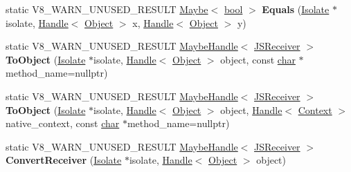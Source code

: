 \begin{DoxyCompactItemize}
\item 
\mbox{\label{classv8_1_1internal_1_1Object_a6515f78d952a5943568c01f6ff6d2113}} 
static V8\+\_\+\+W\+A\+R\+N\+\_\+\+U\+N\+U\+S\+E\+D\+\_\+\+R\+E\+S\+U\+LT \mbox{\hyperlink{classv8_1_1Maybe}{Maybe}}$<$ \mbox{\hyperlink{classbool}{bool}} $>$ {\bfseries Equals} (\mbox{\hyperlink{classv8_1_1internal_1_1Isolate}{Isolate}} $\ast$isolate, \mbox{\hyperlink{classv8_1_1internal_1_1Handle}{Handle}}$<$ \mbox{\hyperlink{classv8_1_1internal_1_1Object}{Object}} $>$ x, \mbox{\hyperlink{classv8_1_1internal_1_1Handle}{Handle}}$<$ \mbox{\hyperlink{classv8_1_1internal_1_1Object}{Object}} $>$ y)
\item 
\mbox{\label{classv8_1_1internal_1_1Object_a75d964b0770f21fb7dd288eea3369241}} 
static V8\+\_\+\+W\+A\+R\+N\+\_\+\+U\+N\+U\+S\+E\+D\+\_\+\+R\+E\+S\+U\+LT \mbox{\hyperlink{classv8_1_1internal_1_1MaybeHandle}{Maybe\+Handle}}$<$ \mbox{\hyperlink{classv8_1_1internal_1_1JSReceiver}{J\+S\+Receiver}} $>$ {\bfseries To\+Object} (\mbox{\hyperlink{classv8_1_1internal_1_1Isolate}{Isolate}} $\ast$isolate, \mbox{\hyperlink{classv8_1_1internal_1_1Handle}{Handle}}$<$ \mbox{\hyperlink{classv8_1_1internal_1_1Object}{Object}} $>$ object, const \mbox{\hyperlink{classchar}{char}} $\ast$method\+\_\+name=nullptr)
\item 
\mbox{\label{classv8_1_1internal_1_1Object_af6e9230f673cc3dd2e23c44b1dcbf686}} 
static V8\+\_\+\+W\+A\+R\+N\+\_\+\+U\+N\+U\+S\+E\+D\+\_\+\+R\+E\+S\+U\+LT \mbox{\hyperlink{classv8_1_1internal_1_1MaybeHandle}{Maybe\+Handle}}$<$ \mbox{\hyperlink{classv8_1_1internal_1_1JSReceiver}{J\+S\+Receiver}} $>$ {\bfseries To\+Object} (\mbox{\hyperlink{classv8_1_1internal_1_1Isolate}{Isolate}} $\ast$isolate, \mbox{\hyperlink{classv8_1_1internal_1_1Handle}{Handle}}$<$ \mbox{\hyperlink{classv8_1_1internal_1_1Object}{Object}} $>$ object, \mbox{\hyperlink{classv8_1_1internal_1_1Handle}{Handle}}$<$ \mbox{\hyperlink{classv8_1_1internal_1_1Context}{Context}} $>$ native\+\_\+context, const \mbox{\hyperlink{classchar}{char}} $\ast$method\+\_\+name=nullptr)
\item 
\mbox{\label{classv8_1_1internal_1_1Object_a5e7e571effe8e36d6c8e5aa00efd3434}} 
static V8\+\_\+\+W\+A\+R\+N\+\_\+\+U\+N\+U\+S\+E\+D\+\_\+\+R\+E\+S\+U\+LT \mbox{\hyperlink{classv8_1_1internal_1_1MaybeHandle}{Maybe\+Handle}}$<$ \mbox{\hyperlink{classv8_1_1internal_1_1JSReceiver}{J\+S\+Receiver}} $>$ {\bfseries Convert\+Receiver} (\mbox{\hyperlink{classv8_1_1internal_1_1Isolate}{Isolate}} $\ast$isolate, \mbox{\hyperlink{classv8_1_1internal_1_1Handle}{Handle}}$<$ \mbox{\hyperlink{classv8_1_1internal_1_1Object}{Object}} $>$ object)

\end{DoxyCompactItemize}
